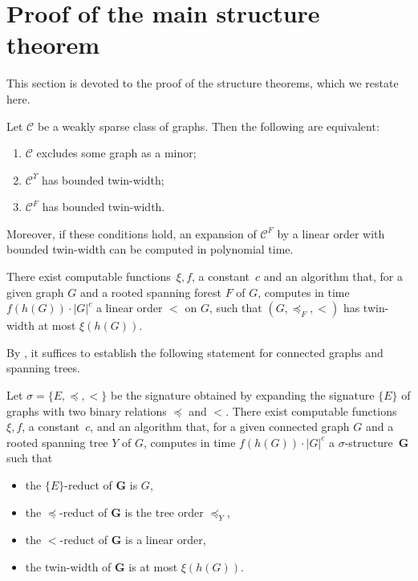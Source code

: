 \documentclass[1p,number,11pt]{elsarticle}
\theoremstyle{plain}
\newcommand{\Cc}{\mathscr{C}}
\begin{document}
\section{Proof of the main structure theorem}\label{sec:proof-main-thm}

This section is devoted to the proof of the structure theorems, which we restate here. 

\begin{theorem}[store=thm-main-structure,restate-keys={note=see \zcpageref[nocap]{thm-main-structure}}]
Let $\Cc$ be a weakly sparse class of graphs. Then the following are equivalent:
\begin{enumerate}[nosep]
    \item $\Cc$ excludes some graph as a minor;
    \item $\Cc^\Upsilon$ has bounded twin-width;
    \item $\Cc^F$ has bounded twin-width.
\end{enumerate}
\medskip 

Moreover, if these conditions hold, an expansion of $\Cc^F$ by a linear order with bounded twin-width can be computed in polynomial time. 
\end{theorem}


\begin{theorem}[store=thm-main-algo,restate-keys={note=see \zcpageref[nocap]{thm-main-algo}}]
There exist computable functions~$\xi,f$, a constant~$c$ and an algorithm that, for a given graph $G$ and a rooted spanning forest $F$ of $G$, computes in time $f(h(G))\cdot|G|^c$ a linear order $<$ on $G$, such that $(G,\preceq_F,<)$  has twin-width  at most $\xi(h(G))$.
\end{theorem}

By , it suffices to establish the following statement for connected graphs and spanning trees.

\begin{theorem}[store=thm-aux-structure,restate-keys={note=see \zcpageref[nocap]{thm-aux-structure}}]
Let $\sigma=\{E,\preceq,<\}$ be the signature obtained by expanding the signature $\{E\}$ of graphs with  two binary relations $\preceq$ and $<$.
There exist computable functions~$\xi,f$, a constant~$c$, and an algorithm that, for a given connected graph $G$ and a rooted spanning tree $Y$ of $G$, computes in time $f(h(G))\cdot|G|^c$ a $\sigma$-structure~$\mathbf G$ such that 
\begin{itemize}[nosep]
    \item the $\{E\}$-reduct of $\mathbf G$ is $G$,
    \item the $\preceq$-reduct of $\mathbf G$ is the tree order $\preceq_Y$,
    \item the $<$-reduct of $\mathbf G$ is a linear order,
    \item the twin-width of $\mathbf G$ is at most $\xi(h(G))$.
\end{itemize}
\end{theorem}
\end{document}
